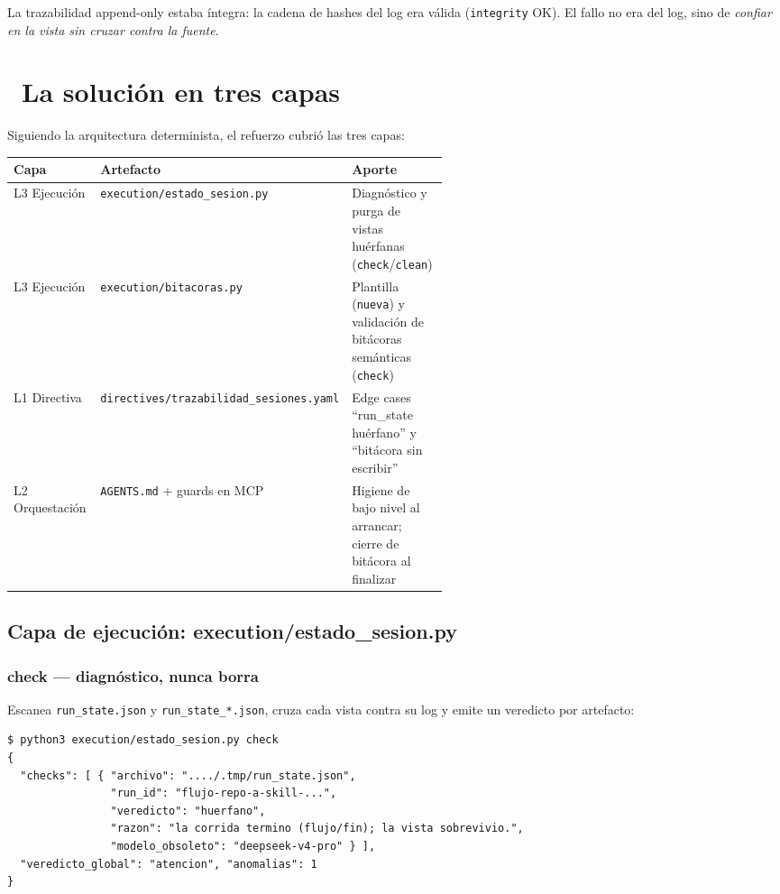 \documentclass[11pt,a4paper]{article}
\newcommand{\iconotexto}[2]{\textcolor{cyanNeon}{\faIcon{#1}}~#2}
\begin{document}
La trazabilidad append-only estaba íntegra: la cadena de hashes del log era válida
(\texttt{integrity} OK). El fallo no era del log, sino de \emph{confiar en la vista sin
cruzar contra la fuente}.

\section{\iconotexto{layer-group}{La solución en tres capas}}

Siguiendo la arquitectura determinista, el refuerzo cubrió las tres capas:

\begin{table}[h]
\centering
\begin{tabularx}{\linewidth}{>{\raggedright\arraybackslash}p{0.20\linewidth} p{0.36\linewidth} X}
\toprule
\textbf{Capa} & \textbf{Artefacto} & \textbf{Aporte} \\
\midrule
L3 Ejecución & \texttt{execution/estado\_sesion.py} & Diagnóstico y purga de vistas huérfanas (\texttt{check}/\texttt{clean}) \\
L3 Ejecución & \texttt{execution/bitacoras.py} & Plantilla (\texttt{nueva}) y validación de bitácoras semánticas (\texttt{check}) \\
L1 Directiva & \texttt{directives/trazabilidad\_sesiones.yaml} & Edge cases ``run\_state huérfano'' y ``bitácora sin escribir'' \\
L2 Orquestación & \texttt{AGENTS.md} + guards en MCP & Higiene de bajo nivel al arrancar; cierre de bitácora al finalizar \\
\bottomrule
\end{tabularx}
\end{table}

\subsection{Capa de ejecución: execution/estado\_sesion.py}

\subsubsection{check --- diagnóstico, nunca borra}
Escanea \texttt{run\_state.json} y \texttt{run\_state\_*.json}, cruza cada vista contra
su log y emite un veredicto por artefacto:

\begin{lstlisting}[style=estiloPython]
$ python3 execution/estado_sesion.py check
{
  "checks": [ { "archivo": "..../.tmp/run_state.json",
                "run_id": "flujo-repo-a-skill-...",
                "veredicto": "huerfano",
                "razon": "la corrida termino (flujo/fin); la vista sobrevivio.",
                "modelo_obsoleto": "deepseek-v4-pro" } ],
  "veredicto_global": "atencion", "anomalias": 1
}
\end{lstlisting}
\end{document}
